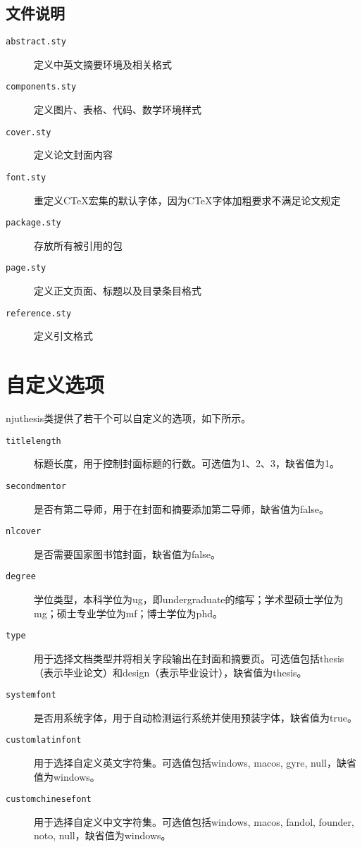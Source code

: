 \subsection{文件说明}
\begin{description}
    \item [\texttt{abstract.sty}] 定义中英文摘要环境及相关格式
    \item [\texttt{components.sty}] 定义图片、表格、代码、数学环境样式
    \item [\texttt{cover.sty}] 定义论文封面内容
    \item [\texttt{font.sty}] 重定义CTeX宏集的默认字体，因为CTeX字体加粗要求不满足论文规定
    \item [\texttt{package.sty}] 存放所有被引用的包
    \item [\texttt{page.sty}] 定义正文页面、标题以及目录条目格式
    \item [\texttt{reference.sty}] 定义引文格式
\end{description}

\section{自定义选项}
\label{sec:classoptions}

njuthesis类提供了若干个可以自定义的选项，如下所示。
\begin{description}
    \item[\texttt{titlelength}] 标题长度，用于控制封面标题的行数。可选值为1、2、3，缺省值为1。
    \item[\texttt{secondmentor}] 是否有第二导师，用于在封面和摘要添加第二导师，缺省值为false。
    \item[\texttt{nlcover}] 是否需要国家图书馆封面，缺省值为false。
    \item[\texttt{degree}] 学位类型，本科学位为ug，即undergraduate的缩写；学术型硕士学位为mg；硕士专业学位为mf；博士学位为phd。
    \item[\texttt{type}] 用于选择文档类型并将相关字段输出在封面和摘要页。可选值包括thesis（表示毕业论文）和design（表示毕业设计），缺省值为thesis。
    \item[\texttt{systemfont}] 是否用系统字体，用于自动检测运行系统并使用预装字体，缺省值为true。
    \item[\texttt{customlatinfont}] 用于选择自定义英文字符集。可选值包括windows, macos, gyre, null，缺省值为windows。
    \item[\texttt{customchinesefont}] 用于选择自定义中文字符集。可选值包括windows, macos, fandol, founder, noto, null，缺省值为windows。
\end{description}
